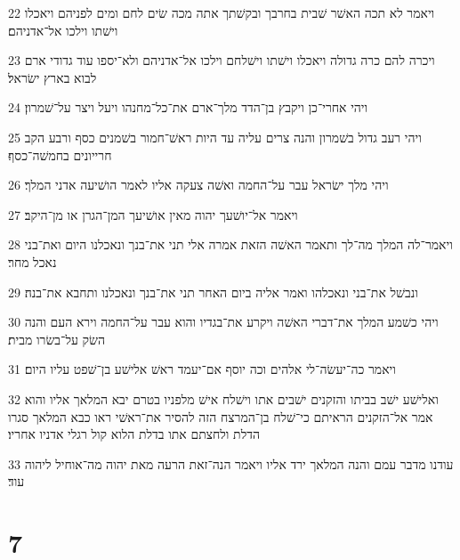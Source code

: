 \par 22 ויאמר לא תכה האשׁר שׁבית בחרבך ובקשׁתך אתה מכה שׂים לחם ומים לפניהם ויאכלו וישׁתו וילכו אל־אדניהם׃
\par 23 ויכרה להם כרה גדולה ויאכלו וישׁתו וישׁלחם וילכו אל־אדניהם ולא־יספו עוד גדודי ארם לבוא בארץ ישׂראל׃
\par 24 ויהי אחרי־כן ויקבץ בן־הדד מלך־ארם את־כל־מחנהו ויעל ויצר על־שׁמרון׃
\par 25 ויהי רעב גדול בשׁמרון והנה צרים עליה עד היות ראשׁ־חמור בשׁמנים כסף ורבע הקב חרייונים בחמשׁה־כסף׃
\par 26 ויהי מלך ישׂראל עבר על־החמה ואשׁה צעקה אליו לאמר הושׁיעה אדני המלך׃
\par 27 ויאמר אל־יושׁעך יהוה מאין אושׁיעך המן־הגרן או מן־היקב׃
\par 28 ויאמר־לה המלך מה־לך ותאמר האשׁה הזאת אמרה אלי תני את־בנך ונאכלנו היום ואת־בני נאכל מחר׃
\par 29 ונבשׁל את־בני ונאכלהו ואמר אליה ביום האחר תני את־בנך ונאכלנו ותחבא את־בנה׃
\par 30 ויהי כשׁמע המלך את־דברי האשׁה ויקרע את־בגדיו והוא עבר על־החמה וירא העם והנה השׂק על־בשׂרו מבית׃
\par 31 ויאמר כה־יעשׂה־לי אלהים וכה יוסף אם־יעמד ראשׁ אלישׁע בן־שׁפט עליו היום׃
\par 32 ואלישׁע ישׁב בביתו והזקנים ישׁבים אתו וישׁלח אישׁ מלפניו בטרם יבא המלאך אליו והוא אמר אל־הזקנים הראיתם כי־שׁלח בן־המרצח הזה להסיר את־ראשׁי ראו כבא המלאך סגרו הדלת ולחצתם אתו בדלת הלוא קול רגלי אדניו אחריו׃
\par 33 עודנו מדבר עמם והנה המלאך ירד אליו ויאמר הנה־זאת הרעה מאת יהוה מה־אוחיל ליהוה עוד׃

\chapter{7}

